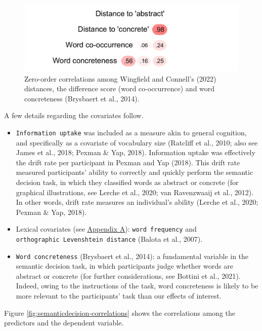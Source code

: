 \documentclass[
  12pt,
  man,floatsintext]{apa7}
\begin{document}
\begin{figure}

{\centering \includegraphics[width=0.63\linewidth]{manuscript_files/figure-latex/semanticdecision-cooccurrence-correlations-1} 

}

\caption{Zero-order correlations among Wingfield and Connell's (2022) distances, the difference score (word co-occurrence) and word concreteness (Brysbaert et al., 2014).}\label{fig:semanticdecision-cooccurrence-correlations}
\end{figure}

A few details regarding the covariates follow.

\begin{itemize}
\item
  \texttt{Information\ uptake} was included as a measure akin to general cognition, and specifically as a covariate of vocabulary size (Ratcliff et al., 2010; also see James et al., 2018; Pexman \& Yap, 2018). Information uptake was effectively the drift rate per participant in Pexman and Yap (2018). This drift rate measured participants' ability to correctly and quickly perform the semantic decision task, in which they classified words as abstract or concrete (for graphical illustrations, see Lerche et al., 2020; van Ravenzwaaij et al., 2012). In other words, drift rate measures an individual's ability (Lerche et al., 2020; Pexman \& Yap, 2018).
\item
  Lexical covariates (see \protect\hyperlink{appendix-A-lexical-covariates}{\underline{Appendix A}}): \texttt{word\ frequency} and \texttt{orthographic\ Levenshtein\ distance} (Balota et al., 2007).
\item
  \texttt{Word\ concreteness} (Brysbaert et al., 2014): a fundamental variable in the semantic decision task, in which participants judge whether words are abstract or concrete (for further considerations, see Bottini et al., 2021). Indeed, owing to the instructions of the task, word concreteness is likely to be more relevant to the participants' task than our effects of interest.
\end{itemize}

Figure \ref{fig:semanticdecision-correlations} shows the correlations among the predictors and the dependent variable.
\end{document}
